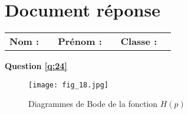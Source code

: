 \newpage
\section*{Document réponse}
\begin{center}
\begin{tabular}{p{}p{}p{}p{}p{}p{}}
\textbf{Nom : } & &
\textbf{Prénom : } &  &
\textbf{Classe : } &  \\

\end{tabular}
\end{center}


\textbf{Question \ref{q:24}}
\begin{figure}[H]
\centering
\texttt{[image: fig\_18.jpg]}
\caption{\label{fig:C} Diagrammes de Bode de la fonction $H(p)$ }%
\end{figure}


%
%
%
%
%
